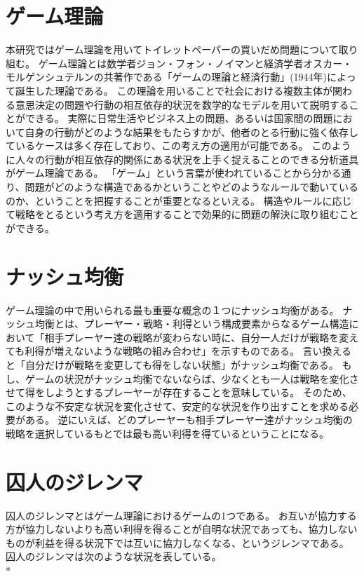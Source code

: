 \section{ゲーム理論}
本研究ではゲーム理論を用いてトイレットペーパーの買いだめ問題について取り組む。
ゲーム理論とは数学者ジョン・フォン・ノイマンと経済学者オスカー・モルゲンシュテルンの共著作である「ゲームの理論と経済行動」(1944年)によって誕生した理論である。
この理論を用いることで社会における複数主体が関わる意思決定の問題や行動の相互依存的状況を数学的なモデルを用いて説明することができる。
実際に日常生活やビジネス上の問題、あるいは国家間の問題において自身の行動がどのような結果をもたらすかが、他者のとる行動に強く依存しているケースは多く存在しており、この考え方の適用が可能である。
このように人々の行動が相互依存的関係にある状況を上手く捉えることのできる分析道具がゲーム理論である。
「ゲーム」という言葉が使われていることから分かる通り、問題がどのような構造であるかということやどのようなルールで動いているのか、ということを把握することが重要となるといえる。
構造やルールに応じて戦略をとるという考え方を適用することで効果的に問題の解決に取り組むことができる。

\section{ナッシュ均衡}
ゲーム理論の中で用いられる最も重要な概念の１つにナッシュ均衡がある。
ナッシュ均衡とは、プレーヤー・戦略・利得という構成要素からなるゲーム構造において「相手プレーヤー達の戦略が変わらない時に、自分一人だけが戦略を変えても利得が増えないような戦略の組み合わせ」を示すものである。
言い換えると「自分だけが戦略を変更しても得をしない状態」がナッシュ均衡である。
もし、ゲームの状況がナッシュ均衡でないならば、少なくとも一人は戦略を変化させて得をしようとするプレーヤーが存在することを意味している。
そのため、このような不安定な状況を変化させて、安定的な状況を作り出すことを求める必要がある。
逆にいえば、どのプレーヤーも相手プレーヤー達がナッシュ均衡の戦略を選択しているもとでは最も高い利得を得ているということになる。

\section{囚人のジレンマ}
囚人のジレンマとはゲーム理論におけるゲームの1つである。
お互いが協力する方が協力しないよりも高い利得を得ることが自明な状況であっても、協力しないものが利益を得る状況下では互いに協力しなくなる、というジレンマである。
囚人のジレンマは次のような状況を表している。\\*

